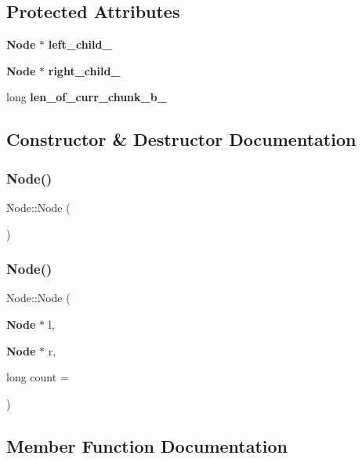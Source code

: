 \subsection*{Protected Attributes}
\begin{DoxyCompactItemize}
\item 
\textbf{ Node} $\ast$ \textbf{ left_child_}
\item 
\textbf{ Node} $\ast$ \textbf{ right_child_}
\item 
long \textbf{ len_of_curr_chunk_b_}
\end{DoxyCompactItemize}


\subsection{Constructor \& Destructor Documentation}
\mbox{\label{class_node_ad7a34779cad45d997bfd6d3d8043c75f}} 
\subsubsection{Node()\hspace{0.1cm}{\footnotesize\ttfamily [1/2]}}
{\footnotesize\ttfamily Node\+::\+Node (\begin{DoxyParamCaption}{ }\end{DoxyParamCaption})\hspace{0.3cm}{\ttfamily [inline]}}

\mbox{\label{class_node_a942858d25ccdfaf7e1d1f4ddbdf13831}} 
\subsubsection{Node()\hspace{0.1cm}{\footnotesize\ttfamily [2/2]}}
{\footnotesize\ttfamily Node\+::\+Node (\begin{DoxyParamCaption}\item[{\textbf{ Node} $\ast$}]{l,  }\item[{\textbf{ Node} $\ast$}]{r,  }\item[{long}]{count = {} }\end{DoxyParamCaption})\hspace{0.3cm}{\ttfamily [inline]}}



\subsection{Member Function Documentation}
\mbox{\label{class_node_a2c339e14824c1960e65c21b19eaad9a0}} 
